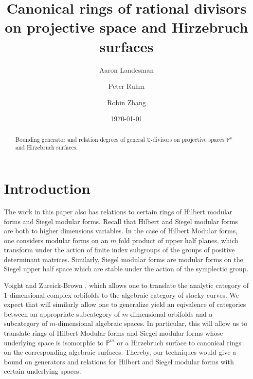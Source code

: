 \documentclass{amsart}
\title{Canonical rings of rational divisors on projective space and Hirzebruch surfaces}
\author{Aaron Landesman}
\author{Peter Ruhm}
\author{Robin Zhang}
\date{\today}
\theoremstyle{plain}
\theoremstyle{definition}
\theoremstyle{remark}
\numberwithin{equation}{section}
\newcommand\bq{{\mathbb Q}}
\newcommand\bp{{\mathbb P}}
\begin{document}
\begin{abstract}
 	Bounding generator and relation degrees of general $\bq$-divisors
	on projective spaces $\bp^n$ and Hirzebruch surfaces.
\end{abstract}

\maketitle


\section{Introduction}



The work in this paper also has relations to certain rings of Hilbert 
modular forms and Siegel modular forms. Recall that Hilbert and Siegel 
modular forms are both to higher dimensions variables. In the case of 
Hilbert Modular forms, one considers modular forms on an $m$ fold product 
of upper half planes, which transform under the action of finite index 
subgroups of the groups of positive determinant matrices. Similarly, Siegel 
modular forms are modular forms on the Siegel upper half space which are 
stable under the action of the symplectic group. 

Voight and Zureick-Brown \cite[Proposition 6.1.5]{vzb:stacky}, which allows one to translate the analytic category of 1-dimensional complex orbifolds to the algebraic category of stacky curves. 
We expect that  will similarly allow one to generalize yield an eqivalence of categories between an appropriate subcategory of $m$-dimensional orbifolds and a subcategory of $m$-dimensional algebraic spaces.
In particular, this will allow us to translate rings of Hilbert Modular forms and Siegel modular forms whose underlying space is isomorphic to $\bp^m$ or a Hirzebruch surface to canonical rings on the corresponding algebraic surfaces. Thereby, our techniques would give a bound on generators and relations for Hilbert and Siegel modular forms with certain underlying spaces.
\end{document}
